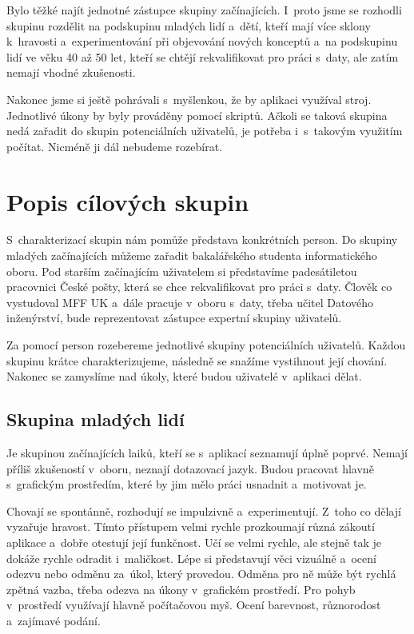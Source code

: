 Bylo těžké najít jednotné zástupce skupiny začínajících. I~proto jsme se rozhodli skupinu rozdělit na podskupinu mladých lidí a~dětí, kteří mají více sklony k~hravosti a~experimentování při objevování nových konceptů a~na podskupinu lidí ve věku 40 až 50 let, kteří se chtějí rekvalifikovat pro práci s~daty, ale zatím nemají vhodné zkušenosti.

Nakonec jsme si ještě pohrávali s~myšlenkou, že by aplikaci využíval stroj. Jednotlivé úkony by byly prováděny pomocí skriptů. Ačkoli se taková skupina nedá zařadit do skupin potenciálních uživatelů, je potřeba i~s~takovým využitím počítat. Nicméně ji dál nebudeme rozebírat.

\section{Popis cílových skupin}

S~charakterizací skupin nám pomůže představa konkrétních person. Do skupiny mladých začínajících můžeme zařadit bakalářského studenta informatického oboru. Pod starším začínajícím uživatelem si představíme padesátiletou pracovnici České pošty, která se chce rekvalifikovat pro práci s~daty. Člověk co vystudoval MFF UK a~dále pracuje v~oboru s~daty, třeba učitel Datového inženýrství, bude reprezentovat zástupce expertní skupiny uživatelů. 

Za pomocí person rozebereme jednotlivé skupiny potenciálních uživatelů. Každou skupinu krátce charakterizujeme, následně se snažíme vystihnout její chování. Nakonec se zamyslíme nad úkoly, které budou uživatelé v~aplikaci dělat.

\subsection{Skupina mladých lidí}

Je skupinou začínajících laiků, kteří se s~aplikací seznamují úplně poprvé. Nemají příliš zkušeností v~oboru, neznají dotazovací jazyk. Budou pracovat hlavně s~grafickým prostředím, které by jim mělo práci usnadnit a~motivovat je.

Chovají se spontánně, rozhodují se impulzivně a~experimentují. Z~toho co dělají vyzařuje hravost. Tímto přístupem velmi rychle prozkoumají různá zákoutí aplikace a~dobře otestují její funkčnost. Učí se velmi rychle, ale stejně tak je dokáže rychle odradit i~maličkost. Lépe si představují věci vizuálně a~ocení odezvu nebo odměnu za~úkol, který provedou. Odměna pro ně může být rychlá zpětná vazba, třeba odezva na úkony v~grafickém prostředí. Pro pohyb v~prostředí využívají hlavně počítačovou myš. Ocení barevnost, různorodost a~zajímavé podání.

